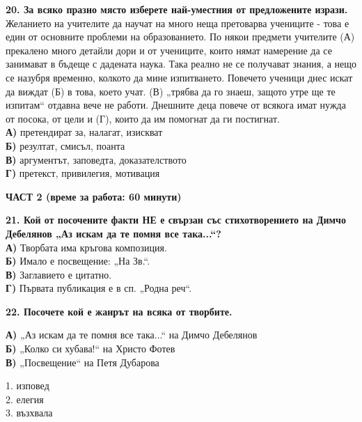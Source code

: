 \documentclass[12pt,a4paper]{article}
\begin{document}
\noindent
\textbf{20. За всяко празно място изберете най-уместния от предложените изрази.} \\
\noindent
Желанието на учителите да научат на много неща претоварва учениците - това е един от основните проблеми на образованието. По някои предмети учителите \makebox[2cm]{\dotfill} (А) прекалено много детайли дори и от учениците, които нямат намерение да се занимават в бъдеще с дадената наука. Така реално не се получават знания, а нещо се назубря временно, колкото да мине изпитването. Повечето ученици днес искат да виждат \makebox[2cm]{\dotfill} (Б) в това, което учат. \makebox[2cm]{\dotfill} (В) „трябва да го знаеш, защото утре ще те изпитам“ отдавна вече не работи. Днешните деца повече от всякога имат нужда от посока, от цели и \makebox[2cm]{\dotfill} (Г), които да им помогнат да ги постигнат. \\
\noindent
\textbf{А)} претендират за, налагат, изискват \\
\textbf{Б)} резултат, смисъл, поанта \\
\textbf{В)} аргументът, заповедта, доказателството \\
\textbf{Г)} претекст, привилегия, мотивация

\newpage

\vspace{0.6cm}

\noindent
\textbf{ЧАСТ 2 (време за работа: 60 минути)}

\vspace{0.3cm}

\noindent
\textbf{21. Кой от посочените факти НЕ е свързан със стихотворението на Димчо Дебелянов „Аз искам да те помня все така...“?} \\
\noindent
\textbf{А)} Творбата има кръгова композиция. \\
\textbf{Б)} Имало е посвещение: „На Зв.“. \\
\textbf{В)} Заглавието е цитатно. \\
\textbf{Г)} Първата публикация е в сп. „Родна реч“.

\vspace{0.6cm}

\noindent
\textbf{22. Посочете кой е жанрът на всяка от творбите.}  \\
\noindent
\begin{minipage}[t]{0.6\textwidth}
\textbf{А)} „Аз искам да те помня все така...“ на Димчо Дебелянов \\
\textbf{Б)} „Колко си хубава!“ на Христо Фотев \\
\textbf{В)} „Посвещение“ на Петя Дубарова
\end{minipage}
\begin{minipage}[t]{0.35\textwidth}
1. изповед \\
2. елегия \\
3. възхвала
\end{minipage}
\end{document}
